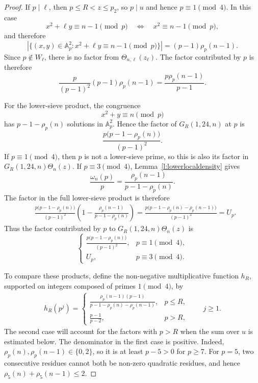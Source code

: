 \documentclass[12pt,reqno]{amsart}
\numberwithin{equation}{section}
\theoremstyle{definition}
\theoremstyle{remark}
\begin{document}
\begin{proof}
If \(p\mid\ell\), then \(p\leq R<z\leq p_2\), so \(p\mid u\) and hence
\(p\equiv1\pmod4\).  In this case
\[
 x^2+\ell y\equiv n-1\pmod p
 \quad\Longleftrightarrow\quad
 x^2\equiv n-1\pmod p,
\]
and therefore
\[
 \left|\{(x,y)\in\mathbb A_p^2:
 x^2+\ell y\equiv n-1\pmod p\}\right|
 =(p-1)\rho_p(n-1).
\]
Since \(p\notin W_\ell\), there is no factor from
\(\Theta_{n,\ell}(z_\ell)\).  The factor contributed by \(p\) is
therefore
\[
 \frac{p}{(p-1)^2}(p-1)\rho_p(n-1)
 =
 \frac{p\rho_p(n-1)}{p-1}.
\]

For the lower-sieve product, the congruence
\[
 x^2+y\equiv n\pmod p
\]
has \(p-1-\rho_p(n)\) solutions in \(\mathbb A_p^2\).  Hence the factor
of \(G_R(1,24,n)\) at \(p\) is
\[
 \frac{p\bigl(p-1-\rho_p(n)\bigr)}{(p-1)^2}.
\]
If \(p\equiv1\pmod4\), then \(p\) is not a lower-sieve prime, so this
is also its factor in \(G_R(1,24,n)\Theta_n(z)\).  If
\(p\equiv3\pmod4\), Lemma~\ref{l:lowerlocaldensity} gives
\[
 \frac{\omega_n(p)}p
 =
 \frac{\rho_p(n-1)}{p-1-\rho_p(n)}.
\]
The factor in the full lower-sieve product is therefore
\begin{align*}
 &\frac{p\bigl(p-1-\rho_p(n)\bigr)}{(p-1)^2}
 \left(
 1-\frac{\rho_p(n-1)}{p-1-\rho_p(n)}
 \right)=
 \frac{p\bigl(p-1-\rho_p(n)-\rho_p(n-1)\bigr)}
 {(p-1)^2}
 =U_p.
\end{align*}
Thus the factor contributed by \(p\) to
\(G_R(1,24,n)\Theta_n(z)\) is
\[
 \begin{cases}
 \displaystyle
 \frac{p\bigl(p-1-\rho_p(n)\bigr)}{(p-1)^2},
     &p\equiv1\pmod4,\\[7pt]
 U_p,&p\equiv3\pmod4.
 \end{cases}
\]

To compare these products, define the non-negative multiplicative
function \(h_R\), supported on integers composed of primes
\(1\pmod4\), by
\begin{align}\label{e:defhR10}
 h_R(p^j)=
 \begin{cases}
 \displaystyle
 \frac{\rho_p(n-1)(p-1)}
 {p-1-\rho_p(n)-\rho_p(n-1)},&p\leq R,\\[8pt]
 \displaystyle\frac{p-1}{p-2},&p>R,
 \end{cases}
 \qquad j\geq1.
\end{align}
The second case will account for the factors with \(p>R\) when the
sum over \(u\) is estimated below.  The denominator in the first case
is positive.  Indeed, \(\rho_p(n),\rho_p(n-1)\in\{0,2\}\), so it is at
least \(p-5>0\) for \(p\geq7\).  For \(p=5\), two consecutive residues
cannot both be non-zero quadratic residues, and hence
\(\rho_5(n)+\rho_5(n-1)\leq2\).


\end{proof}
\end{document}
